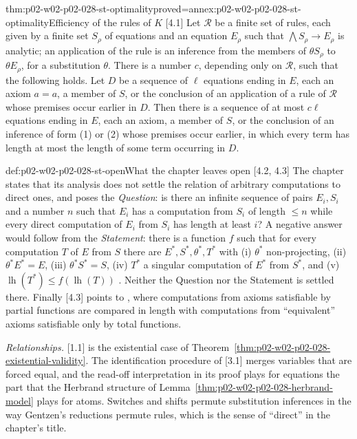 \begin{hbtheorem}{thm:p02-w02-p02-028-st-optimality}{proved=annex:p02-w02-p02-028-st-optimality}{Efficiency of the rules of \(K\) [4.1]}
Let \(\mathcal R\) be a finite set of rules, each given by a finite set
\(S_\rho\) of equations and an equation \(E_\rho\) such that
\(\bigwedge S_\rho\to E_\rho\) is analytic; an application of the rule is an
inference from the members of \(\theta S_\rho\) to \(\theta E_\rho\), for a
substitution \(\theta\).  There is a number \(c\), depending only on
\(\mathcal R\), such that the following holds.  Let \(D\) be a sequence of
\(\ell\) equations ending in \(E\), each an axiom \(a=a\), a member of \(S\),
or the conclusion of an application of a rule of \(\mathcal R\) whose
premises occur earlier in \(D\).  Then there is a sequence of at most
\(c\ell\) equations ending in \(E\), each an axiom, a member of \(S\), or
the conclusion of an inference of form (1) or (2) whose premises occur
earlier, in which every term has length at most the length of some term
occurring in \(D\).
\end{hbtheorem}

\begin{hbwarning}{def:p02-w02-p02-028-st-open}{What the chapter leaves open [4.2, 4.3]}
The chapter states that its analysis does not settle the relation of arbitrary computations to direct ones, and poses the
\emph{Question}: is there an infinite sequence of pairs \(E_i,S_i\) and a
number \(n\) such that \(E_i\) has a computation from \(S_i\) of length
\(\leq n\) while every direct computation of \(E_i\) from \(S_i\) has length
at least \(i\)?  A negative answer would follow from the \emph{Statement}:
there is a function \(f\) such that for every computation \(T\) of \(E\)
from \(S\) there are \(E^*,S^*,\theta^*,T^*\) with (i) \(\theta^*\)
non-projecting, (ii) \(\theta^*E^*=E\), (iii) \(\theta^*S^*=S\), (iv)
\(T^*\) a singular computation of \(E^*\) from \(S^*\), and (v)
\(\operatorname{lh}(T^*)\leq f(\operatorname{lh}(T))\)
\cite[\S4.2, p.~911]{Statman1977}.  Neither the Question nor the Statement is
settled there.  Finally [4.3] points to \cite[Chapter~2]{Statman1974}, where
computations from axioms satisfiable by partial functions are compared in
length with computations from ``equivalent'' axioms satisfiable only by
total functions.
\end{hbwarning}

\emph{Relationships.}  [1.1] is the existential case of
Theorem~\ref{thm:p02-w02-p02-028-existential-validity}.  The identification
procedure of [3.1] merges variables that are forced equal, and the read-off
interpretation in its proof plays for equations the part that the Herbrand
structure of Lemma~\ref{thm:p02-w02-p02-028-herbrand-model} plays for atoms.
Switches and shifts permute substitution inferences in the way Gentzen's
reductions permute rules, which is the sense of ``direct'' in the chapter's
title.

